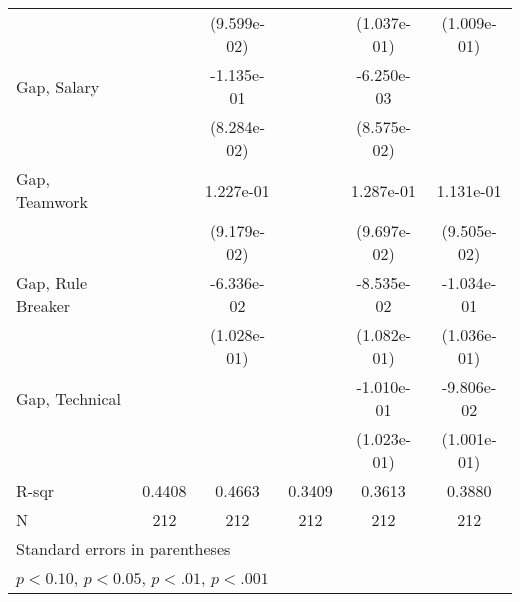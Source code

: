 {\begin{tabular}{l*{5}{c}}
                         &                    & (9.599e-02)        &                    & (1.037e-01)        & (1.009e-01)        \\
\addlinespace
Gap, Salary              &                    &  -1.135e-01        &                    &  -6.250e-03        &                    \\
                         &                    & (8.284e-02)        &                    & (8.575e-02)        &                    \\
\addlinespace
Gap, Teamwork            &                    &   1.227e-01        &                    &   1.287e-01        &   1.131e-01        \\
                         &                    & (9.179e-02)        &                    & (9.697e-02)        & (9.505e-02)        \\
\addlinespace
Gap, Rule Breaker        &                    &  -6.336e-02        &                    &  -8.535e-02        &  -1.034e-01        \\
                         &                    & (1.028e-01)        &                    & (1.082e-01)        & (1.036e-01)        \\
\addlinespace
Gap, Technical           &                    &                    &                    &  -1.010e-01        &  -9.806e-02        \\
                         &                    &                    &                    & (1.023e-01)        & (1.001e-01)        \\
\midrule
R-sqr                    &      0.4408        &      0.4663        &      0.3409        &      0.3613        &      0.3880        \\
N                        &         212        &         212        &         212        &         212        &         212        \\
\bottomrule
\multicolumn{6}{l}{\footnotesize Standard errors in parentheses}\\
\multicolumn{6}{l}{\footnotesize \sym{+} \(p<0.10\), \sym{++} \(p<0.05\), \sym{*} \(p<.01\), \sym{**} \(p<.001\)}\\
\end{tabular}
}

